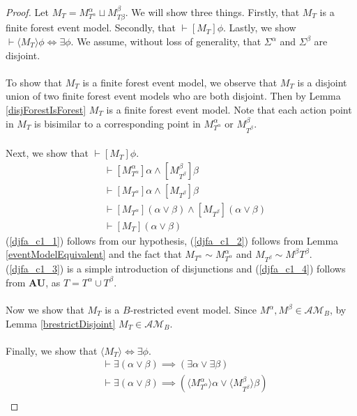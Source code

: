 \documentclass[12pt, a4paper, titlepage]{scrartcl}
\numberwithin{equation}{section}
\newcommand{\sqex}[1]{[{#1}]}
\newcommand{\anex}[1]{\langle {#1} \rangle}
\newcommand{\axAU}{{\bf AU}}
\newcommand{\eventClass}{\mathcal{AM}}
\begin{document}
\begin{proof}
Let $M_T = M^\alpha_{T^\alpha} \sqcup M^\beta_{T\beta}$.
We will show three things.
Firstly, that $M_T$ is a finite forest event model.
Secondly, that $\vdash \sqex{M_T}\phi$.
Lastly, we show $\vdash \anex{ M_T } \phi \iff \exists \phi$.
We assume, without loss of generality, that $\Sigma^\alpha$ and $\Sigma^\beta$ are disjoint.\\
\\
To show that $M_T$ is a finite forest event model, we observe that $M_T$ is a disjoint union of two
finite forest event models who are both disjoint.
Then by Lemma \ref{disjForestIsForest} $M_T$ is a finite forest event model.
Note that each action point in $M_T$ is bisimilar to a corresponding point in $M^\alpha_{T^\alpha}$ or
$M^\beta_{T^\beta}$.\\
\\
Next, we show that $\vdash \sqex{M_T}\phi$.
\begin{align}
	&\vdash \sqex{M^\alpha_{T^\alpha}}\alpha \land \sqex{M^\beta_{T^\beta}}\beta \label{djfa_c1_1}\\
	&\vdash \sqex{M_{T^\alpha}}\alpha \land \sqex{M_{T^\beta}}\beta \label{djfa_c1_2}\\
	&\vdash \sqex{M_{T^\alpha}}(\alpha \lor \beta) \land \sqex{M_{T^\beta}}(\alpha \lor \beta) \label{djfa_c1_3} \\
	&\vdash \sqex{M_T}(\alpha \lor \beta) \label{djfa_c1_4}
\end{align}
(\ref{djfa_c1_1}) follows from our hypothesis, (\ref{djfa_c1_2}) follows from Lemma \ref{eventModelEquivalent} and the fact that
$M_{T^\alpha} \sim M^\alpha_{T^\alpha}$ and $M_{T^\beta} \sim M^\beta{T^\beta}$.
(\ref{djfa_c1_3}) is a simple introduction of disjunctions and (\ref{djfa_c1_4}) follows from \axAU, as
$T = T^\alpha \cup T^\beta$.\\
\\
Now we show that $M_T$ is a $B$-restricted event model.
Since $M^\alpha, M^\beta \in \eventClass_B$, by Lemma \ref{brestrictDisjoint} $M_T \in
\eventClass_B$.\\
\\
Finally, we show that $\anex{M_T} \iff \exists \phi$.
\begin{align}
	&\vdash \exists (\alpha \lor \beta) \implies (\exists \alpha \lor \exists \beta) \label{djfa_c2_1} \\
	&\vdash \exists (\alpha \lor \beta) \implies (\anex{ M^\alpha_{T^\alpha} } \alpha \lor
			\anex{ M^\beta_{T^\beta} }\beta) \label{djfa_c2_2}\\

\end{align}
\end{proof}
\end{document}
